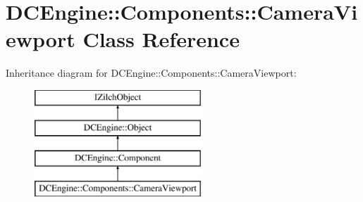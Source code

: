 \hypertarget{classDCEngine_1_1Components_1_1CameraViewport}{\section{D\-C\-Engine\-:\-:Components\-:\-:Camera\-Viewport Class Reference}
\label{classDCEngine_1_1Components_1_1CameraViewport}
}
Inheritance diagram for D\-C\-Engine\-:\-:Components\-:\-:Camera\-Viewport\-:\begin{figure}[H]
\begin{center}
\leavevmode
\includegraphics[height=4.000000cm]{classDCEngine_1_1Components_1_1CameraViewport}
\end{center}
\end{figure}
